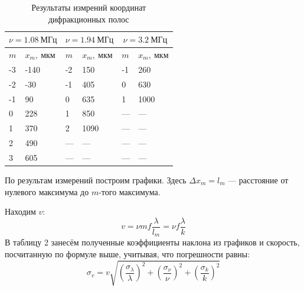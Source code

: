 \documentclass[14pt,a4paper]{article}
\begin{document}
\begin{table}[H]
    \centering
    \begin{tabular}{|l|l|l|l|l|l|}
    \hline
    \multicolumn{2}{|c|}{$\nu=1.08 \ \text{МГц}$} & \multicolumn{2}{c|}{$\nu=1.94 \ \text{МГц}$} & \multicolumn{2}{c|}{$\nu=3.2 \ \text{МГц}$} \\ \hline
        $m$ & $x_m, \ \text{мкм}$ & $m$ & $x_m, \ \text{мкм}$ & $m$ & $x_m, \ \text{мкм}$ \\ \hline
        -3 & -140 & -2  & 150  & -1  & 260  \\ \hline
        -2 & -30  & -1  & 405  & 0   & 630  \\ \hline
        -1 & 90   & 0   & 635  & 1   & 1000 \\ \hline
        0  & 228  & 1   & 850  & --- & ---  \\ \hline
        1  & 370  & 2   & 1090 & --- & ---  \\ \hline
        2  & 490  & --- & ---  & --- & ---  \\ \hline
        3  & 605  & --- & ---  & --- & ---  \\ \hline
    \end{tabular}
\caption{Результаты измрений координат дифракционных полос}
\end{table}

По результам измерений построим графики. Здесь $\Delta x_m = l_m$ --- расстояние от нулевого максимума до $m$-того максимума.

Находим $v$:
\[
v = \nu mf \frac{\lambda}{l_m} = \nu f \frac{\lambda}{k}
\]
В таблицу 2 занесём полученные коэффициенты наклона из графиков и скорость, посчитанную по формуле выше, учитывая, что погрешности равны:
\[
\sigma_v = v \sqrt{\left ( \frac{\sigma_{\lambda}}{\lambda} \right ) ^2 + \left ( \frac{\sigma_{\nu}}{\nu} \right ) ^2 + \left ( \frac{\sigma_{k}}{k} \right ) ^2}
\]
\end{document}
